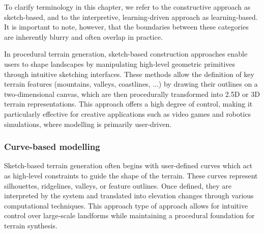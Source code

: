 To clarify terminology in this chapter, we refer to the constructive approach as sketch-based, and to the interpretive, learning-driven approach as learning-based. It is important to note, however, that the boundaries between these categories are inherently blurry and often overlap in practice.

In procedural terrain generation, sketch-based construction approaches enable users to shape landscapes by manipulating high-level geometric primitives through intuitive sketching interfaces. These methods allow the definition of key terrain features (mountains, valleys, coastlines, ...) by drawing their outlines on a two-dimensional canvas, which are then procedurally transformed into 2.5D or 3D terrain representations. This approach offers a high degree of control, making it particularly effective for creative applications such as video games and robotics simulations, where modelling is primarily user-driven.

\subsubsection{Curve-based modelling}

Sketch-based terrain generation often begins with user-defined curves which act as high-level constraints to guide the shape of the terrain. These curves represent silhouettes, ridgelines, valleys, or feature outlines. Once defined, they are interpreted by the system and translated into elevation changes through various computational techniques. This approach type of approach allows for intuitive control over large-scale landforms while maintaining a procedural foundation for terrain synthesis.


